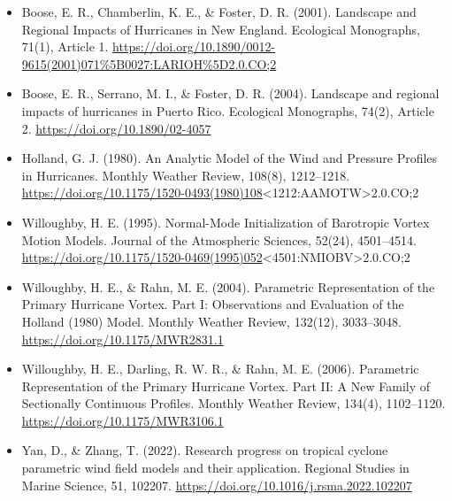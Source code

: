 \documentclass[
]{article}
\begin{document}
\begin{itemize}
\item
  Boose, E. R., Chamberlin, K. E., \& Foster, D. R. (2001). Landscape
  and Regional Impacts of Hurricanes in New England. Ecological
  Monographs, 71(1), Article 1.
  \url{https://doi.org/10.1890/0012-9615(2001)071\%5B0027:LARIOH\%5D2.0.CO;2}
\item
  Boose, E. R., Serrano, M. I., \& Foster, D. R. (2004). Landscape and
  regional impacts of hurricanes in Puerto Rico. Ecological Monographs,
  74(2), Article 2. \url{https://doi.org/10.1890/02-4057}
\item
  Holland, G. J. (1980). An Analytic Model of the Wind and Pressure
  Profiles in Hurricanes. Monthly Weather Review, 108(8), 1212--1218.
  \url{https://doi.org/10.1175/1520-0493(1980)108}\textless1212:AAMOTW\textgreater2.0.CO;2
\item
  Willoughby, H. E. (1995). Normal-Mode Initialization of Barotropic
  Vortex Motion Models. Journal of the Atmospheric Sciences, 52(24),
  4501--4514.
  \url{https://doi.org/10.1175/1520-0469(1995)052}\textless4501:NMIOBV\textgreater2.0.CO;2
\item
  Willoughby, H. E., \& Rahn, M. E. (2004). Parametric Representation of
  the Primary Hurricane Vortex. Part I: Observations and Evaluation of
  the Holland (1980) Model. Monthly Weather Review, 132(12), 3033--3048.
  \url{https://doi.org/10.1175/MWR2831.1}
\item
  Willoughby, H. E., Darling, R. W. R., \& Rahn, M. E. (2006).
  Parametric Representation of the Primary Hurricane Vortex. Part II: A
  New Family of Sectionally Continuous Profiles. Monthly Weather Review,
  134(4), 1102--1120. \url{https://doi.org/10.1175/MWR3106.1}
\item
  Yan, D., \& Zhang, T. (2022). Research progress on tropical cyclone
  parametric wind field models and their application. Regional Studies
  in Marine Science, 51, 102207.
  \url{https://doi.org/10.1016/j.rsma.2022.102207}
\end{itemize}
\end{document}
